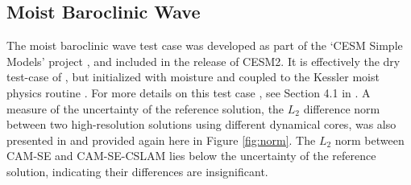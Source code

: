 \documentclass[twocol]{ametsoc}
\begin{document}
\subsection{{\color{red}Moist Baroclinic Wave{}}}

{\color{red}The moist baroclinic wave test case was developed as part of the `CESM Simple Models' project \citep{CESM_SIMPLER_MODELS}, and included in the release of CESM2. It is effectively the dry test-case of \cite{UMJS2014QJRMS}, but initialized with moisture and coupled to the Kessler moist physics routine \citep{K1969MM}. For more details on this test case \cite[which was part of the 2016 Dynamical Core Model Intercomparison Project, ][]{DCMIP16}, see Section 4.1 in \cite{LetAl2018JAMES}. A measure of the uncertainty of the reference solution, the $L_2$ difference norm between two high-resolution solutions using different dynamical cores, was also presented in \cite{LetAl2018JAMES} and provided again here in Figure \ref{fig:norm}. The $L_2$ norm between CAM-SE and CAM-SE-CSLAM lies below the uncertainty of the reference solution, indicating their differences are insignificant.}
\end{document}
